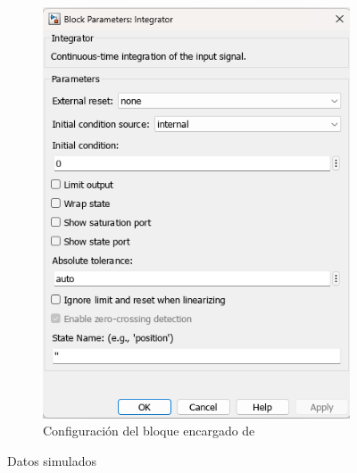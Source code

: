\begin{figure}[htbp]
\begin{subfigure}[b]{0.45\textwidth}
        \includegraphics[width=\textwidth]{fig/Capitulo5/Caso_de_estudio_PID/config_integrator.png}
        \caption{Configuración del bloque encargado de }
        \label{fig:oe_sim}
    \end{subfigure}
    \caption{Datos simulados}
    \label{fig:data_simulated}
\end{figure}

